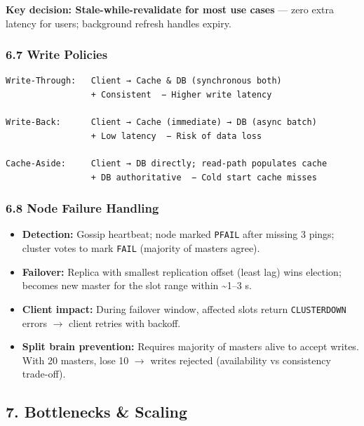 \documentclass[11pt]{article}
\providecommand{\tightlist}{\setlength{\itemsep}{1pt}\setlength{\parskip}{0pt}}
\begin{document}
\textbf{Key decision: Stale-while-revalidate for most use cases} --- zero extra latency for users; background refresh handles expiry.

\subsubsection{6.7 Write Policies}\label{67-write-policies}

\setcodelang{}

\begin{verbatim}
Write-Through:   Client → Cache & DB (synchronous both)
                 + Consistent  − Higher write latency

Write-Back:      Client → Cache (immediate) → DB (async batch)
                 + Low latency  − Risk of data loss

Cache-Aside:     Client → DB directly; read-path populates cache
                 + DB authoritative  − Cold start cache misses
\end{verbatim}

\subsubsection{6.8 Node Failure Handling}\label{68-node-failure-handling}

\begin{itemize}
\tightlist
\item
  \textbf{Detection:} Gossip heartbeat; node marked \texttt{PFAIL} after missing 3 pings; cluster votes to mark \texttt{FAIL} (majority of masters agree).
\item
  \textbf{Failover:} Replica with smallest replication offset (least lag) wins election; becomes new master for the slot range within \textasciitilde1--3 s.
\item
  \textbf{Client impact:} During failover window, affected slots return \texttt{CLUSTERDOWN} errors \(\rightarrow\) client retries with backoff.
\item
  \textbf{Split brain prevention:} Requires majority of masters alive to accept writes. With 20 masters, lose 10 \(\rightarrow\) writes rejected (availability vs consistency trade-off).
\end{itemize}

\subsection{7. Bottlenecks \& Scaling}\label{7-bottlenecks--scaling-2}
\end{document}
